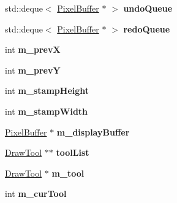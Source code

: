 \begin{DoxyCompactItemize}
\item 
std\+::deque$<$ \hyperlink{classPixelBuffer}{Pixel\+Buffer} $\ast$ $>$ {\bfseries undo\+Queue}\hypertarget{classMIAApp_accb087beb377e88c709a4cbf9c4ebc3a}{}\label{classMIAApp_accb087beb377e88c709a4cbf9c4ebc3a}

\item 
std\+::deque$<$ \hyperlink{classPixelBuffer}{Pixel\+Buffer} $\ast$ $>$ {\bfseries redo\+Queue}\hypertarget{classMIAApp_a75cc180e177c43e20762b3efbce9e641}{}\label{classMIAApp_a75cc180e177c43e20762b3efbce9e641}

\item 
int {\bfseries m\+\_\+prevX}\hypertarget{classMIAApp_adcea1fb15d81c44996df552b86e89422}{}\label{classMIAApp_adcea1fb15d81c44996df552b86e89422}

\item 
int {\bfseries m\+\_\+prevY}\hypertarget{classMIAApp_a604f4f23b559c618a830730c8bd490e5}{}\label{classMIAApp_a604f4f23b559c618a830730c8bd490e5}

\item 
int {\bfseries m\+\_\+stamp\+Height}\hypertarget{classMIAApp_aebea0628c1f88a38c89fddf921621333}{}\label{classMIAApp_aebea0628c1f88a38c89fddf921621333}

\item 
int {\bfseries m\+\_\+stamp\+Width}\hypertarget{classMIAApp_aef09a3e4ca4a7b9df22bc5da1b0824b6}{}\label{classMIAApp_aef09a3e4ca4a7b9df22bc5da1b0824b6}

\item 
\hyperlink{classPixelBuffer}{Pixel\+Buffer} $\ast$ {\bfseries m\+\_\+display\+Buffer}\hypertarget{classMIAApp_a0668047939beaf5bdcce629b5c109f76}{}\label{classMIAApp_a0668047939beaf5bdcce629b5c109f76}

\item 
\hyperlink{classDrawTool}{Draw\+Tool} $\ast$$\ast$ {\bfseries tool\+List}\hypertarget{classMIAApp_ad6c43f1bb4d3b7fe2460abb828e0948e}{}\label{classMIAApp_ad6c43f1bb4d3b7fe2460abb828e0948e}

\item 
\hyperlink{classDrawTool}{Draw\+Tool} $\ast$ {\bfseries m\+\_\+tool}\hypertarget{classMIAApp_a6c18367f5bd7e19a4676d374da94c32b}{}\label{classMIAApp_a6c18367f5bd7e19a4676d374da94c32b}

\item 
int {\bfseries m\+\_\+cur\+Tool}\hypertarget{classMIAApp_acbb2b661aaf03f8757a548b93049ac9d}{}\label{classMIAApp_acbb2b661aaf03f8757a548b93049ac9d}


\end{DoxyCompactItemize}
